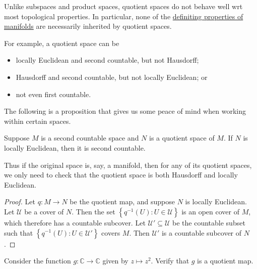 \documentclass[notoc,notitlepage]{tufte-book}
\begin{document}
\begin{warning}
  Unlike subspaces and product spaces, quotient spaces do not behave well wrt most topological
  properties. In particular, none of the \hyperref[defn:manifold]{definiting properties of
  manifolds} are necessarily inherited by quotient spaces.

  For example, a quotient space can be
  \begin{itemize}
    \item locally Euclidean and second countable, but not Hausdorff;
    \item Hausdorff and second countable, but not locally Euclidean; or
    \item not even first countable.
  \end{itemize}
\end{warning}

The following is a proposition that gives us some peace of mind when working within certain
spaces.

\begin{propo}\label{propo:locally_euclidean_quotient_space_of_a_second_countable_space_is_second_countable}
  Suppose $M$ is a second countable space and $N$ is a quotient space of $M$. If $N$ is
  locally Euclidean, then it is second countable.
\end{propo}

\begin{note}
  Thus if the original space is, say, a manifold, then for any of its quotient spaces, we only
  need to check that the quotient space is both Hausdorff and locally Euclidean.
\end{note}

\begin{proof}
  Let $q : M \to N$ be the quotient map, and suppose $N$ is locally Euclidean. Let $\mathcal{U}$
  be a cover of $N$. Then the set $\left\{ q^{-1}(U) : U \in \mathcal{U} \right\}$ is an open
  cover of $M$, which therefore has a countable subcover. Let $\mathcal{U}' \subseteq \mathcal{U}$
  be the countable subset such that $\left\{ q^{-1}(U) : U \in \mathcal{U}' \right\}$ covers $M$.
  Then $\mathcal{U}'$ is a countable subcover of $N$.
\end{proof}

\begin{ex}
  Consider the function $g : \mathbb{C} \to \mathbb{C}$ given by $z \mapsto z^2$. Verify that
  $g$ is a quotient map.
\end{ex}
\end{document}
